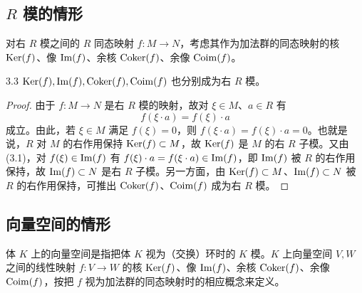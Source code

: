 
\subsection{$R$ 模的情形}

对右 $R$ 模之间的 $R$ 同态映射 $f\colon M\to N$，考虑其作为加法群的同态映射的核 $\operatorname{Ker}(f)$、像 $\operatorname{Im}(f)$、余核 $\operatorname{Coker}(f)$、余像 $\operatorname{Coim}(f)$。

\begin{lemma}{3.3} $\operatorname{Ker}(f),\operatorname{Im}(f),\operatorname{Coker}(f),\operatorname{Coim}(f)$ 也分别成为右 $R$ 模。
\end{lemma}

\begin{proof}
由于 $f\colon M\to N$ 是右 $R$ 模的映射，故对 $\xi\in M$、$a\in R$ 有
\begin{equation}
f(\xi\cdot a)=f(\xi)\cdot a \tag{3.1}
\end{equation}
成立。由此，若 $\xi\in M$ 满足 $f(\xi)=0$，则 $f(\xi\cdot a)=f(\xi)\cdot a=0$。也就是说，$R$ 对 $M$ 的右作用保持 $\operatorname{Ker}(f)\subset M$，故 $\operatorname{Ker}(f)$ 是 $M$ 的右 $R$ 子模。又由 (3.1)，对 $f(\xi)\in\operatorname{Im}(f)$ 有 $f(\xi)\cdot a=f(\xi\cdot a)\in\operatorname{Im}(f)$，即 $\operatorname{Im}(f)$ 被 $R$ 的右作用保持，故 $\operatorname{Im}(f)\subset N$ 是右 $R$ 子模。另一方面，由 $\operatorname{Ker}(f)\subset M$、$\operatorname{Im}(f)\subset N$ 被 $R$ 的右作用保持，可推出 $\operatorname{Coker}(f)$、$\operatorname{Coim}(f)$ 成为右 $R$ 模。
\end{proof}


\subsection{向量空间的情形}

体 $K$ 上的向量空间是指把体 $K$ 视为（交换）环时的 $K$ 模。$K$ 上向量空间 $V,W$ 之间的线性映射 $f\colon V\to W$ 的核 $\operatorname{Ker}(f)$、像 $\operatorname{Im}(f)$、余核 $\operatorname{Coker}(f)$、余像 $\operatorname{Coim}(f)$，按把 $f$ 视为加法群的同态映射时的相应概念来定义。

